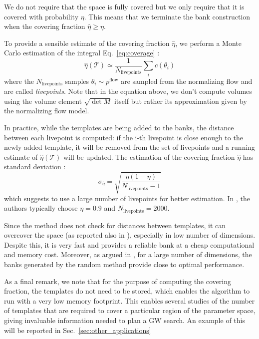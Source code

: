 \documentclass[twocolumn,showpacs,preprintnumbers,nofootinbib,prd,
superscriptaddress,10pt]{revtex4-2}
\begin{document}
We do not require that the space is fully covered but we only require that it is covered with probability $\eta$. This means that we terminate the bank construction when the covering fraction $\hat{\eta} \geq \eta$.

To provide a sensible estimate of the covering fraction $\hat{\eta}$, we perform a Monte Carlo estimation of the integral Eq.~\eqref{eq:coverage} \cite{Coogan:2022qxs}:
\begin{equation}\label{eq:coverage_estimate}
	\hat{\eta}(\mathcal{T}) \simeq \frac{1}{N_\text{livepoints}} \sum_i c(\theta_i)
\end{equation}
%
where the $N_\text{livepoints}$ samples $\theta_i \sim p^\text{flow}$ are sampled from the normalizing flow and are called {\it livepoints}.
Note that in the equation above, we don't compute volumes using the volume element $\sqrt{\det M}$ itself but rather its approximation given by the normalizing flow model.

In practice, while the templates are being added to the banks, the distance between each livepoint is computed: if the i-th livepoint is close enough to the newly added template, it will be removed from the set of livepoints and a running estimate of $\hat{\eta}(\mathcal{T})$ will be updated.
The estimation of the covering fraction $\hat{\eta}$ has standard deviation \cite[App. A]{Coogan:2022qxs}:
\begin{equation}\label{eq:variance_coverage}
	\sigma_{\hat{\eta}} = \sqrt{\frac{\eta(1-\eta)}{N_\text{livepoints}-1}}
\end{equation}
which suggests to use a large number of livepoints for better estimation.
In \cite{Coogan:2022qxs}, the authors typically choose $\eta = 0.9$ and $N_\text{livepoints} = 2000$.

Since the method does not check for distances between templates, it can overcover the space (as reported also in \cite{Messenger:2008ta, Coogan:2022qxs}), especially in low number of dimensions.
Despite this, it is very fast and provides a reliable bank at a cheap computational and memory cost.
Moreover, as argued in \cite{Messenger:2008ta, Allen:2021yuy, Allen:2022lqr}, for a large number of dimensions, the banks generated by the random method provide close to optimal performance.

As a final remark, we note that for the purpose of computing the covering fraction, the templates do not need to be stored, which enables the algorithm to run with a very low memory footprint.
This enables several studies of the number of templates that are required to cover a particular region of the parameter space, giving invaluable information needed to plan a GW search. An example of this will be reported in Sec.~\ref{sec:other_applications}
\end{document}
